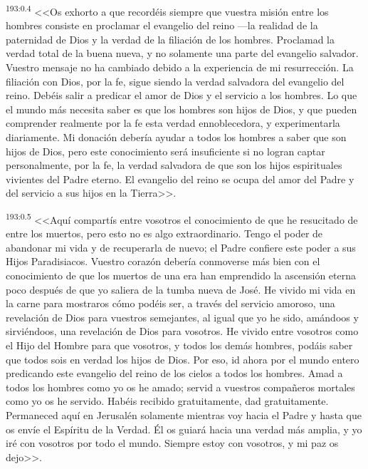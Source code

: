 \par 
\textsuperscript{193:0.4} <<Os exhorto a que recordéis siempre que vuestra misión entre los hombres consiste en proclamar el evangelio del reino ---la realidad de la paternidad de Dios y la verdad de la filiación de los hombres. Proclamad la verdad total de la buena nueva, y no solamente una parte del evangelio salvador. Vuestro mensaje no ha cambiado debido a la experiencia de mi resurrección. La filiación con Dios, por la fe, sigue siendo la verdad salvadora del evangelio del reino. Debéis salir a predicar el amor de Dios y el servicio a los hombres. Lo que el mundo más necesita saber es que los hombres son hijos de Dios, y que pueden comprender realmente por la fe esta verdad ennoblecedora, y experimentarla diariamente. Mi donación debería ayudar a todos los hombres a saber que son hijos de Dios, pero este conocimiento será insuficiente si no logran captar personalmente, por la fe, la verdad salvadora de que son los hijos espirituales vivientes del Padre eterno. El evangelio del reino se ocupa del amor del Padre y del servicio a sus hijos en la Tierra>>.

\par 
\textsuperscript{193:0.5} <<Aquí compartís entre vosotros el conocimiento de que he resucitado de entre los muertos, pero esto no es algo extraordinario. Tengo el poder de abandonar mi vida y de recuperarla de nuevo; el Padre confiere este poder a sus Hijos Paradisiacos. Vuestro corazón debería conmoverse más bien con el conocimiento de que los muertos de una era han emprendido la ascensión eterna poco después de que yo saliera de la tumba nueva de José. He vivido mi vida en la carne para mostraros cómo podéis ser, a través del servicio amoroso, una revelación de Dios para vuestros semejantes, al igual que yo he sido, amándoos y sirviéndoos, una revelación de Dios para vosotros. He vivido entre vosotros como el Hijo del Hombre para que vosotros, y todos los demás hombres, podáis saber que todos sois en verdad los hijos de Dios. Por eso, id ahora por el mundo entero predicando este evangelio del reino de los cielos a todos los hombres. Amad a todos los hombres como yo os he amado; servid a vuestros compañeros mortales como yo os he servido. Habéis recibido gratuitamente, dad gratuitamente. Permaneced aquí en Jerusalén solamente mientras voy hacia el Padre y hasta que os envíe el Espíritu de la Verdad. Él os guiará hacia una verdad más amplia, y yo iré con vosotros por todo el mundo. Siempre estoy con vosotros, y mi paz os dejo>>.

